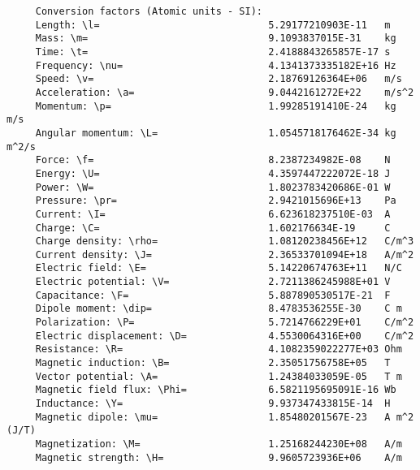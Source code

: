 \documentclass[12pt,a4paper]{article}
\begin{document}
\begin{verbatim}
     Conversion factors (Atomic units - SI):
     Length: \l=                             5.29177210903E-11   m
     Mass: \m=                               9.1093837015E-31    kg
     Time: \t=                               2.4188843265857E-17 s
     Frequency: \nu=                         4.1341373335182E+16 Hz
     Speed: \v=                              2.18769126364E+06   m/s
     Acceleration: \a=                       9.0442161272E+22    m/s^2
     Momentum: \p=                           1.99285191410E-24   kg m/s
     Angular momentum: \L=                   1.0545718176462E-34 kg m^2/s
     Force: \f=                              8.2387234982E-08    N
     Energy: \U=                             4.3597447222072E-18 J
     Power: \W=                              1.8023783420686E-01 W
     Pressure: \pr=                          2.9421015696E+13    Pa
     Current: \I=                            6.623618237510E-03  A
     Charge: \C=                             1.602176634E-19     C
     Charge density: \rho=                   1.08120238456E+12   C/m^3
     Current density: \J=                    2.36533701094E+18   A/m^2
     Electric field: \E=                     5.14220674763E+11   N/C
     Electric potential: \V=                 2.7211386245988E+01 V
     Capacitance: \F=                        5.887890530517E-21  F
     Dipole moment: \dip=                    8.4783536255E-30    C m
     Polarization: \P=                       5.7214766229E+01    C/m^2
     Electric displacement: \D=              4.5530064316E+00    C/m^2
     Resistance: \R=                         4.1082359022277E+03 Ohm
     Magnetic induction: \B=                 2.35051756758E+05   T
     Vector potential: \A=                   1.24384033059E-05   T m
     Magnetic field flux: \Phi=              6.5821195695091E-16 Wb
     Inductance: \Y=                         9.937347433815E-14  H
     Magnetic dipole: \mu=                   1.85480201567E-23   A m^2 (J/T)
     Magnetization: \M=                      1.25168244230E+08   A/m
     Magnetic strength: \H=                  9.9605723936E+06    A/m


\end{verbatim}
\end{document}
